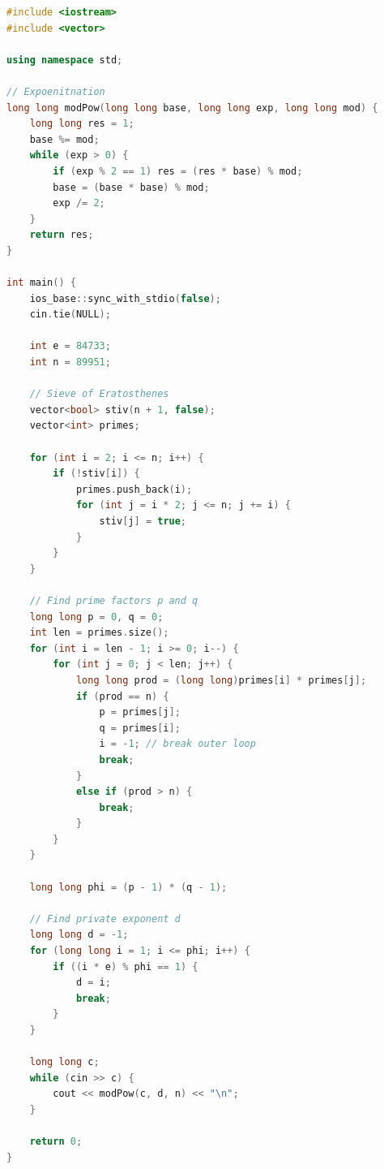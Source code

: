\documentclass[12pt]{article}
\begin{document}
\begin{lstlisting}[language=C++]
#include <iostream>
#include <vector>

using namespace std;

// Expoenitnation
long long modPow(long long base, long long exp, long long mod) {
    long long res = 1;
    base %= mod;
    while (exp > 0) {
        if (exp % 2 == 1) res = (res * base) % mod;
        base = (base * base) % mod;
        exp /= 2;
    }
    return res;
}

int main() {
    ios_base::sync_with_stdio(false);
    cin.tie(NULL);

    int e = 84733;
    int n = 89951;

    // Sieve of Eratosthenes
    vector<bool> stiv(n + 1, false);
    vector<int> primes;

    for (int i = 2; i <= n; i++) {
        if (!stiv[i]) {
            primes.push_back(i);
            for (int j = i * 2; j <= n; j += i) {
                stiv[j] = true;
            }
        }
    }

    // Find prime factors p and q
    long long p = 0, q = 0;
    int len = primes.size();
    for (int i = len - 1; i >= 0; i--) {
        for (int j = 0; j < len; j++) {
            long long prod = (long long)primes[i] * primes[j];
            if (prod == n) {
                p = primes[j];
                q = primes[i];
                i = -1; // break outer loop
                break;
            }
            else if (prod > n) {
                break;
            }
        }
    }

    long long phi = (p - 1) * (q - 1);

    // Find private exponent d
    long long d = -1;
    for (long long i = 1; i <= phi; i++) {
        if ((i * e) % phi == 1) {
            d = i;
            break;
        }
    }

    long long c;
    while (cin >> c) {
        cout << modPow(c, d, n) << "\n";
    }

    return 0;
}\end{lstlisting}
\end{document}

